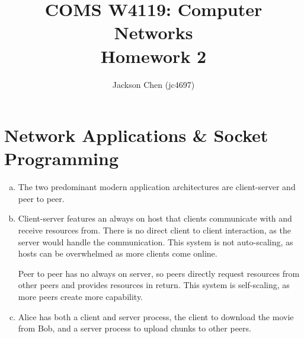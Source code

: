 \documentclass[11pt]{article}
\begin{document}

\title{COMS W4119: Computer Networks\\
       Homework 2}
\author{Jackson Chen (jc4697)} %
\maketitle

\section*{Network Applications \& Socket Programming}
  \begin{enumerate}[(a)]
    \item
      The two predominant modern application architectures are client-server
      and peer to peer.
    \item
      Client-server features an always on host that clients communicate with and
      receive resources from. There is no direct client to client interaction,
      as the server would handle the communication. This system is not auto-scaling,
      as hosts can be overwhelmed as more clients come online.

      Peer to peer has no always on server, so peers directly request resources
      from other peers and provides resources in return. This system is self-scaling,
      as more peers create more capability.
    \item
      Alice has both a client and server process, the client to download the movie
      from Bob, and a server process to upload chunks to other peers.


\end{enumerate}
\end{document}
